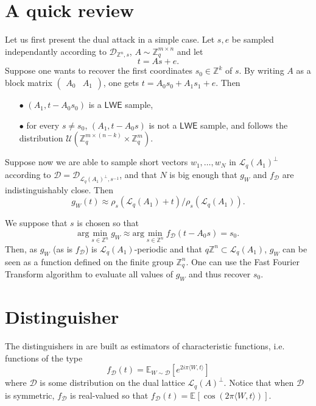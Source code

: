\documentclass{article}
\newcommand{\ZZ}{\mathbb{Z}}
\newcommand{\EE}{\mathbb{E}}
\newcommand{\argmin}{\text{arg}\min}
\newcommand{\D}{\mathcal{D}}
\newcommand{\LL}{\mathcal{L}}
\newcommand{\U}{\mathcal{U}}
\newcommand{\LWE}{\mathsf{LWE}}
\begin{document}
\section{A quick review}  		%
\label{section : QuickReview}	%

Let us first present the dual attack in a simple case. Let $s,e$ be sampled independantly according to $\D_{\ZZ^n,s}$, $A\sim \ZZ_q^{m\times n}$ and let 
\[ t = As + e.\]
Suppose one wants to recover the first coordinates $s_0\in \ZZ^k$ of $s$. By writing $A$ as a block matrix $\left(\begin{array}{c|c} A_0 & A_1 \end{array}\right)$, one gets $t= A_0 s_0 + A_1 s_1 + e$. Then
\begin{itemize}
	\item[$\bullet$] $(A_1, t- A_0 s_0)$ is a $\LWE$ sample,
	\item[$\bullet$] for every $s\neq s_0$, $(A_1, t- A_0 s)$ is not a $\LWE$ sample, and follows the distribution $\U(\ZZ_q^{m\times (n-k)}\times \ZZ_q^m)$.
\end{itemize}

Suppose now we are able to sample short vectors $w_1,\ldots , w_N$ in $\LL_q(A_1)^\perp$ according to $\D = \D_{\LL_q(A_1)^\perp , s^{-1}}$, and that $N$ is big enough that $g_W$ and $f_{\D}$ are indistinguishably close. Then 
\[g_W(t) \approx \rho_s(\LL_q(A_1) +t ) / \rho_s(\LL_q(A_1) ).\]

We suppose that $s$ is chosen so that 
\[\argmin_{s\in \ZZ^n}g_W \approx \argmin_{s\in \ZZ^n} f_{\D}(t - A_0 s) = s_0.\] 
Then, as $g_W$ (as is $f_\D$) is $\LL_q(A_1)$-periodic and that $q\ZZ^n\subset \LL_q(A_1)$, $g_W$ can be seen as a function defined on the finite group $\ZZ_q^n$. One can use the Fast Fourier Transform algorithm to evaluate all values of $g_W$ and thus recover $s_0$.

\section{Distinguisher}  		%
\label{section : Distinguisher}	%

The distinguishers in \cite{PoulyShen,DucasPulles} are built as estimators of characteristic functions, i.e. functions of the type
\[f_\D(t) = \EE_{W\sim \D}[e^{2i\pi \langle W, t\rangle}]  \]
where $\D$ is some distribution on the dual lattice $\LL_q(A)^{\perp}$. Notice that when $\D$ is symmetric, $f_\D$  is real-valued so that $f_\D(t) = \EE_{}[\cos(2\pi \langle W ,t\rangle)]$.\\
\end{document}
